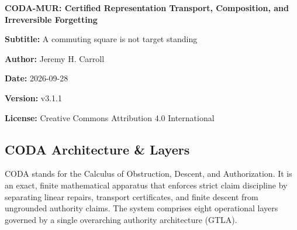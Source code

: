 \documentclass[
  11pt,
]{article}
\begin{document}
\begin{center}
{\Large\bfseries CODA-MUR: Certified Representation Transport, Composition, and Irreversible Forgetting}\par
\textbf{Subtitle:} A commuting square is not target standing

\textbf{Author:} Jeremy H. Carroll

\textbf{Date:} 2026-09-28

\textbf{Version:} v3.1.1

\textbf{License:} Creative Commons Attribution 4.0 International

\end{center}

\subsection{CODA Architecture \& Layers}\label{coda-architecture-layers}

CODA stands for the Calculus of Obstruction, Descent, and Authorization. It is an exact, finite mathematical apparatus that enforces strict claim discipline by separating linear repairs, transport certificates, and finite descent from ungrounded authority claims. The system comprises eight operational layers governed by a single overarching authority architecture (GTLA).
\end{document}

